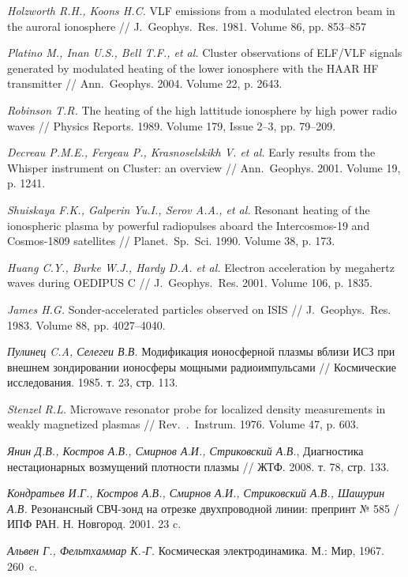 \documentclass[10pt]{disser}
\begin{document}
\begin{thebibliography}{99}
\textit{Holzworth R.H., Koons H.C.} VLF emissions from a modulated electron beam in the auroral ionosphere // J.~Geophys.~Res. 1981. Volume 86, pp. 853--857 

\textit{Platino M., Inan U.S., Bell T.F., et al.} Cluster observations of ELF/VLF signals generated by modulated heating of the lower ionosphere with the HAAR HF transmitter // Ann.~Geophys. 2004. Volume 22, p. 2643. %

\textit{Robinson T.R.} The heating of the high lattitude ionosphere by high power radio waves // Physics Reports. 1989. Volume 179, Issue 2--3, pp. 79--209. %

\textit{Decreau P.M.E., Fergeau P., Krasnoselskikh V. et al.} Early results from the Whisper instrument on Cluster: an overview // Ann.~Geophys. 2001. Volume 19, p. 1241. %

\textit{Shuiskaya F.K., Galperin Yu.I., Serov A.A., et al.} Resonant heating of the ionospheric plasma by powerful radiopulses aboard the Intercosmos-19 and Cosmos-1809 satellites // Planet.~Sp.~Sci. 1990. Volume 38, p. 173. %

\textit{Huang C.Y., Burke W.J., Hardy D.A. et al.} Electron acceleration by megahertz waves during OEDIPUS C // J.~Geophys.~Res. 2001. Volume 106, p. 1835. %

\textit{James H.G.} Sonder-accelerated particles observed on ISIS // J.~Geophys.~Res. 1983. Volume 88, pp. 4027--4040. %

\textit{Пулинец C.A, Селегеи В.В.} Модификация ионосферной плазмы вблизи ИСЗ при внешнем зондировании ионосферы мощными радиоимпульсами // Космические исследования. 1985. т. 23, стр. 113.

\textit{Stenzel R.L.} Microwave resonator probe for localized density measurements in weakly magnetized plasmas // Rev.~.~Instrum. 1976. Volume 47, p. 603.

\textit{Янин Д.В., Костров А.В., Смирнов А.И., Стриковский А.В.}, Диагностика нестационарных возмущений плотности плазмы // ЖТФ. 2008. т. 78, стр. 133.

\textit{Кондратьев И.Г., Костров А.В., Смирнов А.И., Стриковский А.В., Шашурин А.В.} Резонансный СВЧ-зонд  на отрезке двухпроводной линии: препринт № 585 / ИПФ РАН. Н. Новгород. 2001. 23 c.

\textit{Альвен Г., Фельтхаммар К.-Г.} Космическая электродинамика. М.: Мир, 1967. 260~c.


\end{thebibliography}
\end{document}
